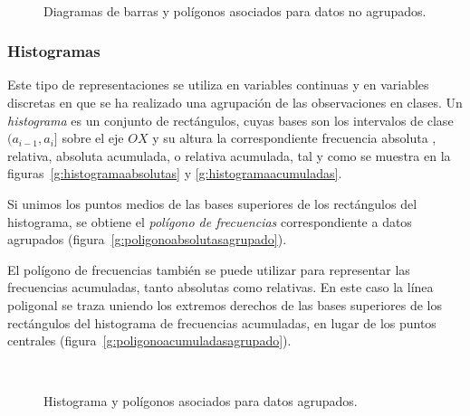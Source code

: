 \begin{figure}[h!]
\centering
{}\qquad
{}\\
\qquad
{}
\caption{Diagramas de barras y polígonos asociados para datos no
agrupados.}
\end{figure}


\subsubsection{Histogramas}

Este tipo de representaciones se utiliza en variables continuas y en variables discretas en que se ha realizado una agrupación de las observaciones en clases. Un \emph{histograma} es un conjunto de rectángulos, cuyas bases son los intervalos de clase $(a_{i-1},a_i]$ sobre el eje $OX$ y su altura la correspondiente frecuencia absoluta
, relativa, absoluta acumulada, o relativa acumulada, tal y como se muestra en la figuras~\ref{g:histogramaabsolutas} y \ref{g:histogramaacumuladas}.
 
Si unimos los puntos medios de las bases superiores de los rectángulos del histograma, se obtiene el \emph{polígono de frecuencias} correspondiente a datos agrupados (figura~\ref{g:poligonoabsolutasagrupado}).

El polígono de frecuencias también se puede utilizar para representar las frecuencias acumuladas, tanto absolutas como relativas.
En este caso la línea poligonal se traza uniendo los extremos derechos de las bases superiores de los rectángulos del histograma de frecuencias acumuladas, en lugar de los puntos centrales (figura~\ref{g:poligonoacumuladasagrupado}).

\begin{figure}[h!]
\centering
{}\qquad
{}\\
\qquad
{}
\caption{Histograma y polígonos asociados para datos agrupados.}
\end{figure}

